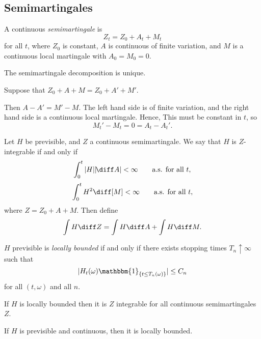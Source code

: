 \documentclass[12pt]{article}
\begin{document}
\subsection{Semimartingales}%
\label{sub:sem}

\begin{definition}
	A continuous \emph{semimartingale} is
	\[
	Z_t = Z_0 + A_t + M_t
	\]
	for all $t$, where $Z_0$ is constant, $A$ is continuous of finite variation, and $M$ is a continuous local martingale with $A_0 = M_0 = 0$.
\end{definition}

\begin{proposition}
	The semimartingale decomposition is unique.
\end{proposition}

\begin{proofbox}
	Suppose that $Z_0 + A + M = Z_0 + A' + M'$.

	Then $A - A' = M' - M$. The left hand side is of finite variation, and the right hand side is a continuous local martingale. Hence, This must be constant in $t$, so
	\[
	M_t' - M_t = 0 = A_t - A_t'.
	\]
\end{proofbox}

\begin{definition}
	Let $H$ be previsible, and $Z$ a continuous semimartingale. We say that $H$ is $Z$-integrable if and only if
	\[
		\int_0^{t} |H| |\! \diff A| < \infty \qquad\text{a.s. for all }t,
	\]
	\[
		\int_0^{t} H^2 \diff [M] < \infty \qquad\text{a.s. for all }t,
	\]
	where $Z = Z_0 + A + M$. Then define
	\[
	\int H \diff Z = \int H \diff A + \int H \diff M.
	\]
\end{definition}

\begin{definition}
	$H$ previsible is \emph{locally bounded} if and only if there exists stopping times $T_n \uparrow \infty$ such that
	\[
		|H_t(\omega) \mathbbm{1}_{\{t \leq T_n(\omega)\}}| \leq C_n
	\]
	for all $(t, \omega)$ and all $n$.
\end{definition}

\begin{remark}
	If $H$ is locally bounded then it is $Z$ integrable for all continuous semimartingales $Z$.
\end{remark}

\begin{remark}
	If $H$ is previsible and continuous, then it is locally bounded.
\end{remark}
\end{document}
